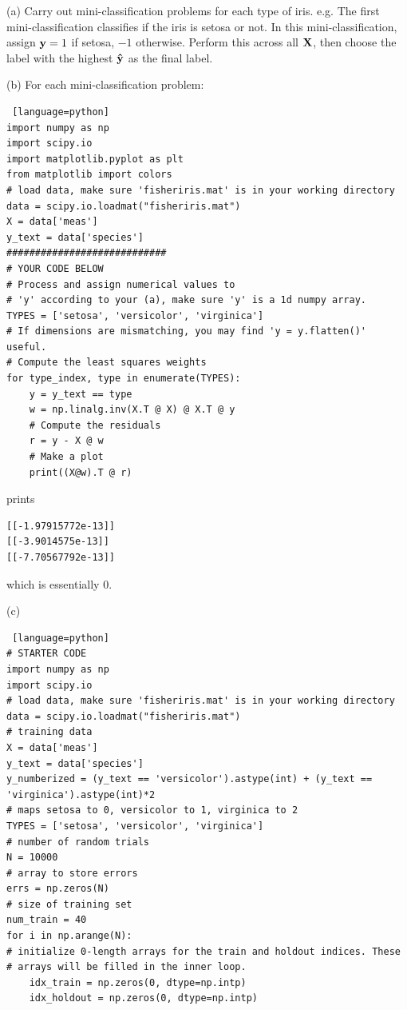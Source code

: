 \documentclass[a4paper, 12pt]{article}
\begin{document}
\begin{problem} [Problem 3]
\end{problem}
\begin{solution}

(a)
Carry out mini-classification problems for each type of iris. e.g. The first mini-classification classifies if the iris is setosa or not. In this mini-classification, assign $\mathbf{y} = 1$ if setosa, $-1$ otherwise. Perform this across all $\mathbf{X}$, then choose the label with the highest $\mathbf{\hat{y}}$ as the final label.

(b) For each mini-classification problem:
\begin{lstlisting} [language=python]
import numpy as np
import scipy.io
import matplotlib.pyplot as plt
from matplotlib import colors
# load data, make sure 'fisheriris.mat' is in your working directory
data = scipy.io.loadmat("fisheriris.mat")
X = data['meas']
y_text = data['species']
############################
# YOUR CODE BELOW
# Process and assign numerical values to
# 'y' according to your (a), make sure 'y' is a 1d numpy array.
TYPES = ['setosa', 'versicolor', 'virginica']
# If dimensions are mismatching, you may find 'y = y.flatten()' useful.
# Compute the least squares weights
for type_index, type in enumerate(TYPES):
    y = y_text == type
    w = np.linalg.inv(X.T @ X) @ X.T @ y
    # Compute the residuals
    r = y - X @ w
    # Make a plot
    print((X@w).T @ r)
    \end{lstlisting}
prints
\begin{lstlisting}
[[-1.97915772e-13]]
[[-3.9014575e-13]]
[[-7.70567792e-13]]
\end{lstlisting}
which is essentially 0.

(c)
\begin{lstlisting} [language=python]
# STARTER CODE
import numpy as np
import scipy.io
# load data, make sure 'fisheriris.mat' is in your working directory
data = scipy.io.loadmat("fisheriris.mat")
# training data
X = data['meas']
y_text = data['species']
y_numberized = (y_text == 'versicolor').astype(int) + (y_text == 'virginica').astype(int)*2
# maps setosa to 0, versicolor to 1, virginica to 2
TYPES = ['setosa', 'versicolor', 'virginica']
# number of random trials
N = 10000
# array to store errors
errs = np.zeros(N)
# size of training set
num_train = 40
for i in np.arange(N):
# initialize 0-length arrays for the train and holdout indices. These
# arrays will be filled in the inner loop.
    idx_train = np.zeros(0, dtype=np.intp)
    idx_holdout = np.zeros(0, dtype=np.intp)


\end{lstlisting}
\end{solution}
\end{document}
